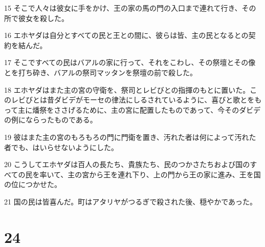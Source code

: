 \par 15 そこで人々は彼女に手をかけ、王の家の馬の門の入口まで連れて行き、その所で彼女を殺した。
\par 16 エホヤダは自分とすべての民と王との間に、彼らは皆、主の民となるとの契約を結んだ。
\par 17 そこですべての民はバアルの家に行って、それをこわし、その祭壇とその像とを打ち砕き、バアルの祭司マッタンを祭壇の前で殺した。
\par 18 エホヤダはまた主の宮の守衛を、祭司とレビびとの指揮のもとに置いた。このレビびとは昔ダビデがモーセの律法にしるされているように、喜びと歌とをもって主に燔祭をささげるために、主の宮に配置したものであって、今そのダビデの例にならったものである。
\par 19 彼はまた主の宮のもろもろの門に門衛を置き、汚れた者は何によって汚れた者でも、はいらせないようにした。
\par 20 こうしてエホヤダは百人の長たち、貴族たち、民のつかさたちおよび国のすべての民を率いて、主の宮から王を連れ下り、上の門から王の家に進み、王を国の位につかせた。
\par 21 国の民は皆喜んだ。町はアタリヤがつるぎで殺された後、穏やかであった。

\chapter{24}

